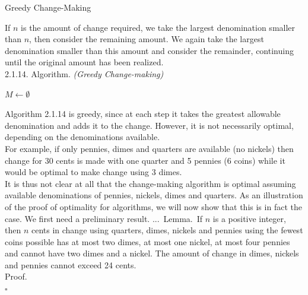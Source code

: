 \documentclass[smaller,hyperref={CJKbookmarks=true}]{beamer}
\newenvironment{PROOF}{{\noindent\!\sf\alert{Proof.}}\\}{\hfill$\square$\\}
\newcounter{zhuo}[subsection]
\renewcommand{\thezhuo}{\thesection.\thesubsection.\arabic{zhuo}}
\newenvironment{LEMMA}{\stepcounter{zhuo}\alert{\thezhuo.~Lemma.\,}}{}
\begin{document}
\begin{frame}{Greedy Change-Making}
\begin{spacing}{1}
If $n$ is the amount of change required, we take the largest denomination
smaller than $n$, then consider the remaining amount. We again take the
largest denomination smaller than this amount and consider the
remainder, continuing until the original amount has been realized.\\[4pt]
\alert{2.1.14. Algorithm.} \emph{(Greedy Change-making)}\\
\IncMargin{1em}
\begin{algorithm}[H]
$M\leftarrow\emptyset$\;
\end{algorithm}\DecMargin{1em}
\newpage
\vspace*{7pt}
Algorithm 2.1.14 is greedy, since at each step it takes the greatest
allowable denomination and adds it to the change. However, it is not
necessarily optimal, depending on the denominations available.\\[5pt]
For example, if only pennies, dimes and quarters are available (no nickels)
then change for 30 cents is made with one quarter and 5 pennies (6 coins)
while it would be optimal to make change using 3 dimes.\\[5pt]
It is thus not clear at all that the change-making algorithm is optimal
assuming available denominations of pennies, nickels, dimes and quarters.
As an illustration of the proof of optimality for algorithms, we will now
show that this is in fact the case. We first need a preliminary result.
\newpage
\vspace*{9pt}
\begin{LEMMA}
If $n$ is a positive integer, then $n$ cents in change using
quarters, dimes, nickels and pennies using the fewest coins possible has at
most two dimes, at most one nickel, at most four pennies and cannot have
two dimes and a nickel. The amount of change in dimes, nickels and
pennies cannot exceed 24 cents.\\[8pt]
\end{LEMMA}
\begin{PROOF}

\end{PROOF}
\end{spacing}
\end{frame}
\end{document}

